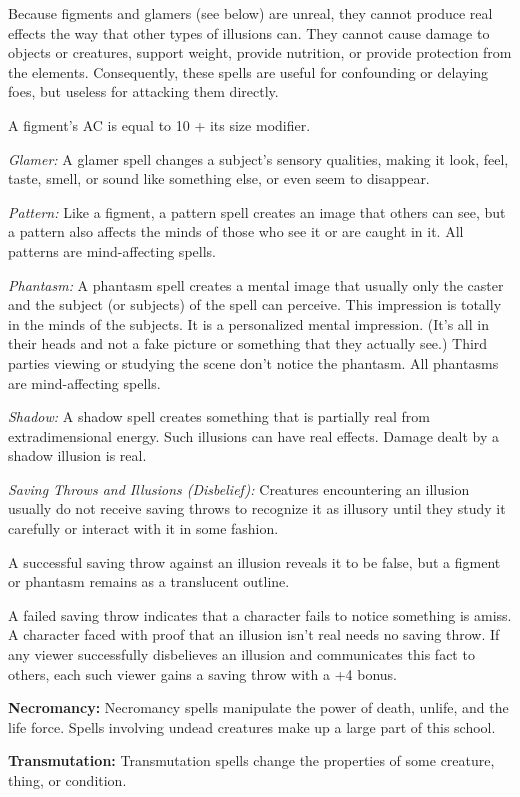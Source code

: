 Because figments and glamers (see below) are unreal, they cannot produce real effects the way that other types of illusions can. They cannot cause damage to objects or creatures, support weight, provide nutrition, or provide protection from the elements. Consequently, these spells are useful for confounding or delaying foes, but useless for attacking them directly.

A figment's AC is equal to 10 + its size modifier.

\textit{Glamer:} A glamer spell changes a subject's sensory qualities, making it look, feel, taste, smell, or sound like something else, or even seem to disappear.

\textit{Pattern:} Like a figment, a pattern spell creates an image that others can see, but a pattern also affects the minds of those who see it or are caught in it. All patterns are mind-affecting spells.

\textit{Phantasm:} A phantasm spell creates a mental image that usually only the caster and the subject (or subjects) of the spell can perceive. This impression is totally in the minds of the subjects. It is a personalized mental impression. (It's all in their heads and not a fake picture or something that they actually see.) Third parties viewing or studying the scene don't notice the phantasm. All phantasms are mind-affecting spells.

\textit{Shadow:} A shadow spell creates something that is partially real from extradimensional energy. Such illusions can have real effects. Damage dealt by a shadow illusion is real.

\textit{Saving Throws and Illusions (Disbelief):} Creatures encountering an illusion usually do not receive saving throws to recognize it as illusory until they study it carefully or interact with it in some fashion.

A successful saving throw against an illusion reveals it to be false, but a figment or phantasm remains as a translucent outline.

A failed saving throw indicates that a character fails to notice something is amiss. A character faced with proof that an illusion isn't real needs no saving throw. If any viewer successfully disbelieves an illusion and communicates this fact to others, each such viewer gains a saving throw with a +4 bonus.

\textbf{Necromancy:} Necromancy spells manipulate the power of death, unlife, and the life force. Spells involving undead creatures make up a large part of this school.

\textbf{Transmutation:} Transmutation spells change the properties of some creature, thing, or condition.